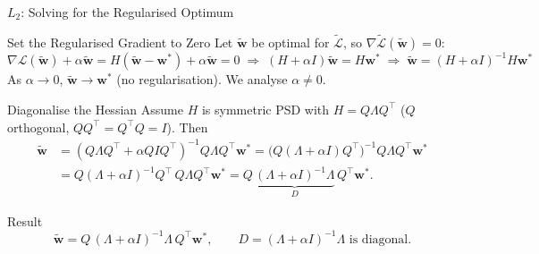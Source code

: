 \documentclass{beamer}
\begin{document}
\begin{frame}[shrink=10]{$L_2$: Solving for the Regularised Optimum}
  \begin{block}{Set the Regularised Gradient to Zero}
    Let $\tilde{\mathbf{w}}$ be optimal for $\widetilde{\mathcal L}$, so
    $\nabla\widetilde{\mathcal L}(\tilde{\mathbf{w}}) = 0$:
    \[
      \nabla\mathcal L(\tilde{\mathbf{w}}) + \alpha\tilde{\mathbf{w}}
        = H(\tilde{\mathbf{w}}-\mathbf{w}^{*}) + \alpha\tilde{\mathbf{w}} = 0
      \;\Rightarrow\;
      (H+\alpha I)\tilde{\mathbf{w}} = H\mathbf{w}^{*}
      \;\Rightarrow\;
      \boxed{\tilde{\mathbf{w}} = (H+\alpha I)^{-1}H\mathbf{w}^{*}}
    \]
    As $\alpha\to 0$, $\tilde{\mathbf{w}}\to\mathbf{w}^{*}$ (no
    regularisation). We analyse $\alpha\neq 0$.
  \end{block}

  \begin{block}{Diagonalise the Hessian}
    Assume $H$ is symmetric PSD with $H = Q\Lambda Q^{\top}$ ($Q$
    orthogonal, $QQ^{\top}=Q^{\top}Q=I$). Then
    \begin{align*}
      \tilde{\mathbf{w}}
        &= (Q\Lambda Q^{\top} + \alpha QIQ^{\top})^{-1} Q\Lambda Q^{\top}\mathbf{w}^{*}
         = \bigl(Q(\Lambda+\alpha I)Q^{\top}\bigr)^{-1} Q\Lambda Q^{\top}\mathbf{w}^{*}\\
        &= Q(\Lambda+\alpha I)^{-1}Q^{\top}\,Q\Lambda Q^{\top}\mathbf{w}^{*}
         = Q\,\underbrace{(\Lambda+\alpha I)^{-1}\Lambda}_{D}\,Q^{\top}\mathbf{w}^{*}.
    \end{align*}
  \end{block}

  \begin{exampleblock}{Result}
    \[
      \boxed{\;
        \tilde{\mathbf{w}} = Q\,(\Lambda+\alpha I)^{-1}\Lambda\,Q^{\top}\mathbf{w}^{*}
        ,\qquad
        D = (\Lambda+\alpha I)^{-1}\Lambda \text{ is diagonal.}
      \;}
    \]
  \end{exampleblock}
\end{frame}
\end{document}
